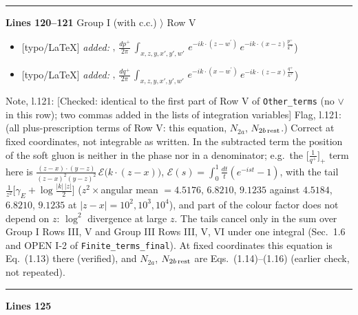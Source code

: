 \documentclass[10pt]{article}
\newenvironment{notebox}{\def\FrameCommand{{\color{notebar}\vrule width 1.5pt}\hspace{6pt}}\MakeFramed{\advance\hsize-\width\FrameRestore}\small}{\endMakeFramed}
\begin{document}
\noindent\rule{\linewidth}{0.3pt}\par\noindent\textbf{Lines 120--121} \quad \textsf{Group I (with c.c.) $\rangle$ Row V} \par
\begin{itemize}[leftmargin=2.2em,itemsep=1pt,topsep=2pt]
\item[\textbf{l.120}] \textsf{\small [typo/LaTeX]} \emph{added:} $\displaystyle ,$$\displaystyle \, \frac{dp^{+}}{2\pi}\,\int_{x,z,y,x',y',w'}\,e^{-ik\cdot (z-w^\prime)}\,e^{-ik\cdot (x-z)\frac{p^{+}}{k^{+}}}${\color{gray}\small)}
\item[\textbf{l.120}] \textsf{\small [typo/LaTeX]} \emph{added:} $\displaystyle ,$$\displaystyle \, \frac{dq^{+}}{2\pi}\,\int_{x,z,y,x',y',w'}\,e^{-ik\cdot (x-w^\prime)}\,e^{-ik\cdot (z-x)\frac{q^{+}}{k^{+}}}${\color{gray}\small)}
\end{itemize}
\begin{notebox}\textsf{\small Note, l.121:} [Checked: identical to the first part of Row V of \texttt{Other\_terms} (no $\vee$ in this row); two commas added in the lists of integration variables]\end{notebox}
\begin{notebox}\textsf{\small Flag, l.121:}  (all plus-prescription terms of Row V: this equation, $N_{2a}$, $N_{2b\,\rm rest}$.) Correct at fixed coordinates, not integrable as written. In the subtracted term the position of the soft gluon is neither in the phase nor in a denominator; e.g.\ the $\big[\frac{1}{q^{+}}\big]_{+}$ term here is $\frac{(z-x)\cdot(y-z)}{(z-x)^{2}(y-z)^{2}}\,\mathcal{E}\big(k\cdot(z-x)\big)$, $\mathcal{E}(s)=\int_{0}^{1}\frac{dt}{t}(e^{-ist}-1)$, with the tail $\frac{1}{z^{2}}\big[\gamma_{E}+\log\frac{|k|\,|z|}{2}\big]$ ($z^{2}\times$angular mean $=4.5176$, $6.8210$, $9.1235$ against $4.5184$, $6.8210$, $9.1235$ at $|z-x|=10^{2},10^{3},10^{4}$), and part of the colour factor does not depend on $z$: $\log^{2}$ divergence at large $z$. The tails cancel only in the sum over Group I Rows III, V and Group III Rows III, V, VI under one integral (Sec.~1.6 and OPEN I-2 of \texttt{Finite\_terms\_final}). At fixed coordinates this equation is Eq.~(1.13) there (verified), and $N_{2a}$, $N_{2b\,\rm rest}$ are Eqs.~(1.14)--(1.16) (earlier check, not repeated).\end{notebox}
\noindent\rule{\linewidth}{0.3pt}\par\noindent\textbf{Lines 125}\par
\end{document}
